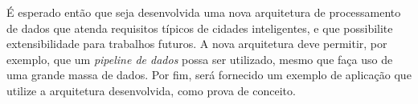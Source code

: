 É esperado então que seja desenvolvida uma nova arquitetura de processamento
de dados que atenda requisitos típicos de cidades inteligentes, e que possibilite
extensibilidade para trabalhos futuros. A nova arquitetura deve permitir,
por exemplo, que um \textit{pipeline de dados} possa ser utilizado, mesmo que
faça uso de uma grande massa de dados. Por fim, será fornecido um exemplo de
aplicação que utilize a arquitetura desenvolvida, como prova de conceito.
